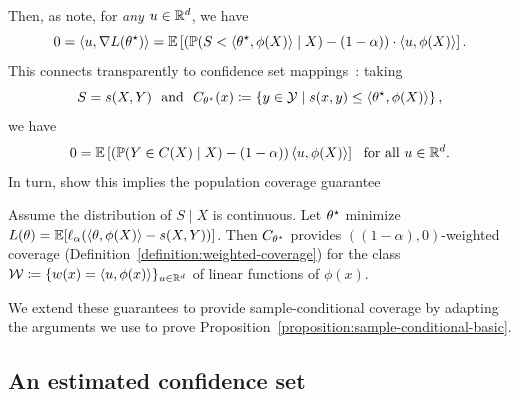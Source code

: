 \documentclass{article}
\newcommand{\loss}{\ell}
\newcommand{\poploss}{L}
\newcommand{\scorefunc}{s}
\newcommand{\scoreval}{\scorefunc}
\newcommand{\scorerv}{S}
\begin{document}
%
Then, as \citet{GibbsChCa25} note, for \emph{any} $u \in \mathbb{R}^d$, we have
\begin{equation*}
  0 = \<u, \nabla \poploss(\theta\opt)\>
  = \E\left[\left(\P(\scorerv < \<\theta\opt, \phi(X)\> \mid X)
    - (1 - \alpha)\right) \cdot \<u, \phi(X)\> \right].
\end{equation*}
This connects transparently to confidence set
mappings~\cite{GibbsChCa25,JungNoRaRo23}: taking
\begin{equation*}
  \scorerv = \scoreval(X, Y)
  ~~ \mbox{and} ~~
  C_{\theta\opt}(x) \defeq \left\{y \in \mc{Y} \mid \scoreval(x, y) \le
  \<\theta\opt, \phi(X)\>\right\},
\end{equation*}
we have
\begin{align*}
  0 = \mathbb{E}\left[\left(\mathbb{P}(Y \in C(X) \mid X) - (1 - \alpha)\right)
    \langle u, \phi(X)\rangle\right]
  ~~ \mbox{for~all~} u \in \mathbb{R}^d.
\end{align*}
In turn, \citet{GibbsChCa25} show this implies the population coverage guarantee
\begin{corollary}
  \label{corollary:population-weighted-coverage}
  Assume the distribution of $\scorerv \mid X$ is continuous.
  Let $\theta^\star$ minimize $\poploss(\theta) =
  \E[\loss_\alpha(\<\theta, \phi(X)\> - \scoreval(X, Y))]$.
  Then $C_{\theta^\star}$ provides $((1 - \alpha), 0)$-weighted coverage
  (Definition~\ref{definition:weighted-coverage}) for the class $\mathcal{W}
  \coloneqq \{w(x) = \langle u, \phi(x)\rangle\}_{u \in \mathbb{R}^d}$ of linear functions
  of $\phi(x)$.
\end{corollary}

We extend these guarantees to provide sample-conditional coverage by
adapting the arguments we use
to prove Proposition~\ref{proposition:sample-conditional-basic}.



\subsection{An estimated confidence set}
\end{document}
